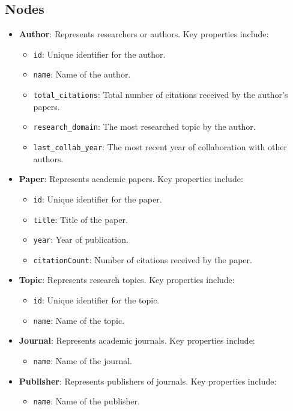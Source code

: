 \documentclass[conference, 12pt]{IEEEtran}
\begin{document}
\subsection{Nodes}
\begin{itemize}
    \item \textbf{Author}: Represents researchers or authors. Key properties include:
    \begin{itemize}
        \item \texttt{id}: Unique identifier for the author.
        \item \texttt{name}: Name of the author.
        \item \texttt{total\_citations}: Total number of citations received by the author's papers.
        \item \texttt{research\_domain}: The most researched topic by the author.
        \item \texttt{last\_collab\_year}: The most recent year of collaboration with other authors.
    \end{itemize}
    \item \textbf{Paper}: Represents academic papers. Key properties include:
    \begin{itemize}
        \item \texttt{id}: Unique identifier for the paper.
        \item \texttt{title}: Title of the paper.
        \item \texttt{year}: Year of publication.
        \item \texttt{citationCount}: Number of citations received by the paper.
    \end{itemize}
    \item \textbf{Topic}: Represents research topics. Key properties include:
    \begin{itemize}
        \item \texttt{id}: Unique identifier for the topic.
        \item \texttt{name}: Name of the topic.
    \end{itemize}
    \item \textbf{Journal}: Represents academic journals. Key properties include:
    \begin{itemize}
        \item \texttt{name}: Name of the journal.
    \end{itemize}
    \item \textbf{Publisher}: Represents publishers of journals. Key properties include:
    \begin{itemize}
        \item \texttt{name}: Name of the publisher.
    \end{itemize}
\end{itemize}
\end{document}
